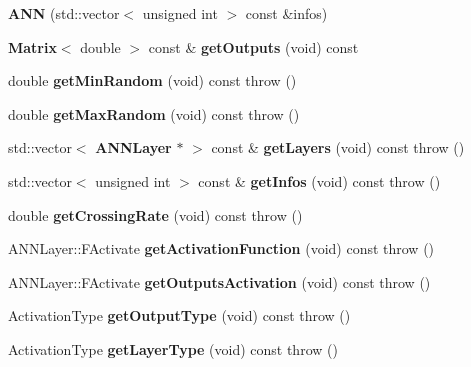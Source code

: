 \begin{DoxyCompactItemize}
\item 
{\bfseries A\+N\+N} (std\+::vector$<$ unsigned int $>$ const \&infos)\label{class_g_a_n_n_1_1_a_n_n_a8b7b98feba4aea412db698035cdcb418}

\item 
{\bf Matrix}$<$ double $>$ const \& {\bfseries get\+Outputs} (void) const \label{class_g_a_n_n_1_1_a_n_n_a0303bfc7a9de4d36ad50df27d6a0b307}

\item 
double {\bfseries get\+Min\+Random} (void) const   throw ()\label{class_g_a_n_n_1_1_a_n_n_a732ada0242d9ac9a9a52c7f0c09ca26a}

\item 
double {\bfseries get\+Max\+Random} (void) const   throw ()\label{class_g_a_n_n_1_1_a_n_n_a3baaedfda1392d8eea5c9a814567626d}

\item 
std\+::vector$<$ {\bf A\+N\+N\+Layer} $\ast$ $>$ const \& {\bfseries get\+Layers} (void) const   throw ()\label{class_g_a_n_n_1_1_a_n_n_aae0bb973b321fa30761fdca66cf3be3c}

\item 
std\+::vector$<$ unsigned int $>$ const \& {\bfseries get\+Infos} (void) const   throw ()\label{class_g_a_n_n_1_1_a_n_n_a2c692cd8c701e1aa9b756e4a2151e651}

\item 
double {\bfseries get\+Crossing\+Rate} (void) const   throw ()\label{class_g_a_n_n_1_1_a_n_n_a0f0cfbbfd49b831516075cd6360366ad}

\item 
A\+N\+N\+Layer\+::\+F\+Activate {\bfseries get\+Activation\+Function} (void) const   throw ()\label{class_g_a_n_n_1_1_a_n_n_ab94e7f60a43f5bef2314529075a95487}

\item 
A\+N\+N\+Layer\+::\+F\+Activate {\bfseries get\+Outputs\+Activation} (void) const   throw ()\label{class_g_a_n_n_1_1_a_n_n_a26b4cbdcbe8bd55986963b26c2e152ee}

\item 
Activation\+Type {\bfseries get\+Output\+Type} (void) const   throw ()\label{class_g_a_n_n_1_1_a_n_n_ae783b900af56e40c3c59fe0d87d402e7}

\item 
Activation\+Type {\bfseries get\+Layer\+Type} (void) const   throw ()\label{class_g_a_n_n_1_1_a_n_n_a769ffd61d28d8c814b30d629ab496fe1}


\end{DoxyCompactItemize}
